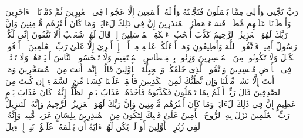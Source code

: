 \startbuffer[\q:26:169]
رَبِّ نَجِّنِی وَأَهۡلِی مِمَّا یَعۡمَلُونَ%
\stopbuffer%
\startbuffer[\q:26:170]
فَنَجَّیۡنَٰهُ وَأَهۡلَهُۥۤ أَجۡمَعِینَ%
\stopbuffer%
\startbuffer[\q:26:171]
إِلَّا عَجُوزࣰا فِی ٱلۡغَٰبِرِینَ%
\stopbuffer%
\startbuffer[\q:26:172]
ثُمَّ دَمَّرۡنَا ٱلۡءَاخَرِینَ%
\stopbuffer%
\startbuffer[\q:26:173]
وَأَمۡطَرۡنَا عَلَیۡهِم مَّطَرࣰاۖ فَسَاۤءَ مَطَرُ ٱلۡمُنذَرِینَ%
\stopbuffer%
\startbuffer[\q:26:174]
إِنَّ فِی ذَٰلِكَ لَءَایَةࣰۖ وَمَا كَانَ أَكۡثَرُهُم مُّؤۡمِنِینَ%
\stopbuffer%
\startbuffer[\q:26:175]
وَإِنَّ رَبَّكَ لَهُوَ ٱلۡعَزِیزُ ٱلرَّحِیمُ%
\stopbuffer%
\startbuffer[\q:26:176]
كَذَّبَ أَصۡحَٰبُ لۡءَیۡكَةِ ٱلۡمُرۡسَلِینَ%
\stopbuffer%
\startbuffer[\q:26:177]
إِذۡ قَالَ لَهُمۡ شُعَیۡبٌ أَلَا تَتَّقُونَ%
\stopbuffer%
\startbuffer[\q:26:178]
إِنِّی لَكُمۡ رَسُولٌ أَمِینࣱ%
\stopbuffer%
\startbuffer[\q:26:179]
فَٱتَّقُوا۟ ٱللَّهَ وَأَطِیعُونِ%
\stopbuffer%
\startbuffer[\q:26:180]
وَمَاۤ أَسۡءَلُكُمۡ عَلَیۡهِ مِنۡ أَجۡرٍۖ إِنۡ أَجۡرِیَ إِلَّا عَلَىٰ رَبِّ ٱلۡعَٰلَمِینَ%
\stopbuffer%
\startbuffer[\q:26:181]
۞ أَوۡفُوا۟ ٱلۡكَیۡلَ وَلَا تَكُونُوا۟ مِنَ ٱلۡمُخۡسِرِینَ%
\stopbuffer%
\startbuffer[\q:26:182]
وَزِنُوا۟ بِٱلۡقِسۡطَاسِ ٱلۡمُسۡتَقِیمِ%
\stopbuffer%
\startbuffer[\q:26:183]
وَلَا تَبۡخَسُوا۟ ٱلنَّاسَ أَشۡیَاۤءَهُمۡ وَلَا تَعۡثَوۡا۟ فِی ٱلۡأَرۡضِ مُفۡسِدِینَ%
\stopbuffer%
\startbuffer[\q:26:184]
وَٱتَّقُوا۟ ٱلَّذِی خَلَقَكُمۡ وَٱلۡجِبِلَّةَ ٱلۡأَوَّلِینَ%
\stopbuffer%
\startbuffer[\q:26:185]
قَالُوۤا۟ إِنَّمَاۤ أَنتَ مِنَ ٱلۡمُسَحَّرِینَ%
\stopbuffer%
\startbuffer[\q:26:186]
وَمَاۤ أَنتَ إِلَّا بَشَرࣱ مِّثۡلُنَا وَإِن نَّظُنُّكَ لَمِنَ ٱلۡكَٰذِبِینَ%
\stopbuffer%
\startbuffer[\q:26:187]
فَأَسۡقِطۡ عَلَیۡنَا كِسَفࣰا مِّنَ ٱلسَّمَاۤءِ إِن كُنتَ مِنَ ٱلصَّٰدِقِینَ%
\stopbuffer%
\startbuffer[\q:26:188]
قَالَ رَبِّیۤ أَعۡلَمُ بِمَا تَعۡمَلُونَ%
\stopbuffer%
\startbuffer[\q:26:189]
فَكَذَّبُوهُ فَأَخَذَهُمۡ عَذَابُ یَوۡمِ ٱلظُّلَّةِۚ إِنَّهُۥ كَانَ عَذَابَ یَوۡمٍ عَظِیمٍ%
\stopbuffer%
\startbuffer[\q:26:190]
إِنَّ فِی ذَٰلِكَ لَءَایَةࣰۖ وَمَا كَانَ أَكۡثَرُهُم مُّؤۡمِنِینَ%
\stopbuffer%
\startbuffer[\q:26:191]
وَإِنَّ رَبَّكَ لَهُوَ ٱلۡعَزِیزُ ٱلرَّحِیمُ%
\stopbuffer%
\startbuffer[\q:26:192]
وَإِنَّهُۥ لَتَنزِیلُ رَبِّ ٱلۡعَٰلَمِینَ%
\stopbuffer%
\startbuffer[\q:26:193]
نَزَلَ بِهِ ٱلرُّوحُ ٱلۡأَمِینُ%
\stopbuffer%
\startbuffer[\q:26:194]
عَلَىٰ قَلۡبِكَ لِتَكُونَ مِنَ ٱلۡمُنذِرِینَ%
\stopbuffer%
\startbuffer[\q:26:195]
بِلِسَانٍ عَرَبِیࣲّ مُّبِینࣲ%
\stopbuffer%
\startbuffer[\q:26:196]
وَإِنَّهُۥ لَفِی زُبُرِ ٱلۡأَوَّلِینَ%
\stopbuffer%
\startbuffer[\q:26:197]
أَوَ لَمۡ یَكُن لَّهُمۡ ءَایَةً أَن یَعۡلَمَهُۥ عُلَمَٰۤؤُا۟ بَنِیۤ إِسۡرَٰۤءِیلَ%
